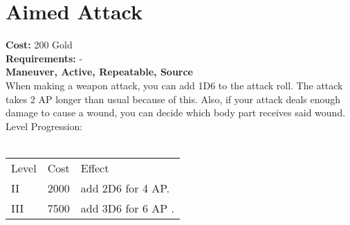 \section*{Aimed Attack}
\textbf{Cost:} 200 Gold\\
\textbf{Requirements:} -\\
\textbf{Maneuver, Active, Repeatable, Source}\\
When making a weapon attack, you can add 1D6 to the attack roll. The attack takes 2 AP longer than usual because of this. Also, if your attack deals enough damage to cause a wound, you can decide which body part receives said wound.
\\
Level Progression:\\
\\
\begin{tabular}{l | l | l}
	Level & Cost & Effect\\
	II & 2000 & add 2D6 for 4 AP.\\
	III & 7500 & add 3D6 for 6 AP .\\
\end{tabular}